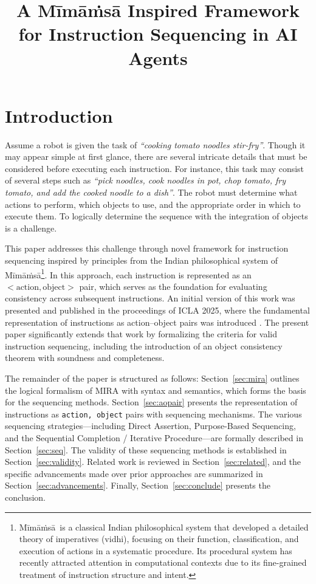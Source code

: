 \documentclass[a4paper,11pt]{lmcs}
\title{A M\={i}m\={a}\.{m}s\={a} Inspired Framework for Instruction Sequencing in AI Agents}
\author{}
\newcommand{\mimamsa}{M\={i}m\={a}\.ms\={a}}
\begin{document}
\maketitle

\begin{abstract}

\end{abstract}

\section{Introduction}
Assume a robot is given the task of \textit{``cooking tomato noodles stir-fry''}. Though it may appear simple at first glance, there are several intricate details that must be considered before executing each instruction. For instance, this task may consist of several steps such as \textit{``pick noodles, cook noodles in pot, chop tomato, fry tomato, and add the cooked noodle to a dish''}. The robot must determine what actions to perform, which objects to use, and the appropriate order in which to execute them. To logically determine the sequence with the integration of objects is a challenge.

This paper addresses this challenge through novel framework for instruction sequencing inspired by principles from the Indian philosophical system of \mimamsa\footnote{\mimamsa~is a classical Indian philosophical system that developed a detailed theory of imperatives (vidhi), focusing on their function, classification, and execution of actions in a systematic procedure. Its procedural system has recently attracted attention in computational contexts due to its fine-grained treatment of instruction structure and intent.}.  In this approach, each instruction is represented as an $<\text{action}, \text{object}>$ pair, which serves as the foundation for evaluating consistency across subsequent instructions. An initial version of this work was presented and published in the proceedings of ICLA 2025, where the fundamental representation of instructions as action–object pairs was introduced \cite{llm_mira}. The present paper significantly extends that work by formalizing the criteria for valid instruction sequencing, including the introduction of an object consistency theorem with soundness and completeness.

The remainder of the paper is structured as follows: Section~\ref{sec:mira} outlines the logical formalism of MIRA with syntax and semantics, which forms the basis for the sequencing methods. Section~\ref{sec:aopair} presents the representation of instructions as \texttt{action, object} pairs with sequencing mechanisms. The various sequencing strategies—including Direct Assertion, Purpose-Based Sequencing, and the Sequential Completion / Iterative Procedure—are formally described in Section~\ref{sec:seq}. The validity of these sequencing methods is established in Section~\ref{sec:validity}. Related work is reviewed in Section~\ref{sec:related}, and the specific advancements made over prior approaches are summarized in Section~\ref{sec:advancements}. Finally, Section~\ref{sec:conclude} presents the conclusion.
\end{document}
